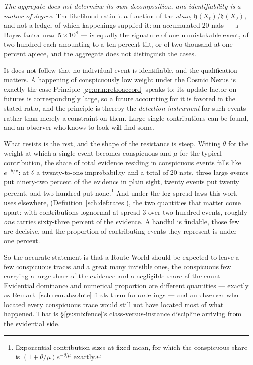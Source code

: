 \documentclass[11pt]{article}
\numberwithin{equation}{section}
\theoremstyle{plain}
\theoremstyle{definition}
\theoremstyle{remark}
\newcommand{\hm}{\mathfrak{h}}
\begin{document}
\emph{The aggregate does not determine its own decomposition, and
identifiability is a matter of degree.} The likelihood ratio is a
function of the \emph{state}, $\hm(X_t)/\hm(X_0)$, and not a ledger of
which happenings supplied it: an accumulated $20$ nats --- a Bayes factor
near $5\times10^{8}$ --- is equally the signature of one unmistakable
event, of two hundred each amounting to a ten-percent tilt, or of two
thousand at one percent apiece, and the aggregate does not distinguish
the cases.

It does not follow that no individual event is identifiable, and the
qualification matters. A happening of conspicuously low weight under the
Cosmic Nexus is exactly the case
Principle~\ref{gc:prin:retroaccord} speaks to: its update factor on
futures is correspondingly large, so a future accounting for it is
favored in the stated ratio, and the principle is thereby the
\emph{detection instrument} for such events rather than merely a
constraint on them. Large single contributions can be found, and an
observer who knows to look will find some.

What resists is the rest, and the shape of the resistance is steep.
Writing $\theta$ for the weight at which a single event becomes
conspicuous and $\mu$ for the typical contribution, the share of total
evidence residing in conspicuous events falls like $e^{-\theta/\mu}$: at
$\theta$ a twenty-to-one improbability and a total of $20$ nats, three
large events put ninety-two percent of the evidence in plain sight,
twenty events put twenty percent, and two hundred put
none.\footnote{Exponential contribution sizes at fixed mean, for which
the conspicuous share is $(1+\theta/\mu)e^{-\theta/\mu}$ exactly.} And
under the log-spread laws this work uses elsewhere,
(Definition~\ref{sch:def:rates}), the two quantities that matter come
apart: with contributions lognormal at spread $3$ over two hundred
events, roughly \emph{one} carries sixty-three percent of the evidence.
A handful is findable, those few are decisive, and the proportion of
contributing events they represent is under one percent.

So the accurate statement is that a Route World should be expected to leave
a few conspicuous traces and a great many invisible ones, the conspicuous
few carrying a large share of the evidence and a negligible share of the
count. Evidential dominance and numerical proportion are different
quantities --- exactly as Remark~\ref{sch:rem:absolute} finds them for
orderings --- and an observer who located every conspicuous trace would
still not have located most of what happened. That is
\S\ref{gs:sub:fence}'s class-versus-instance discipline arriving from the
evidential side.
\end{document}
